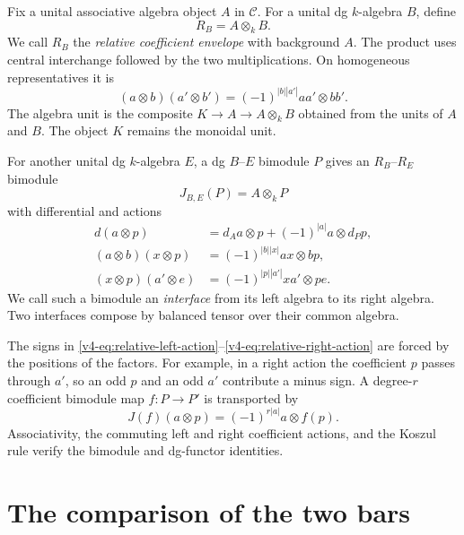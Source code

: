 Fix a unital associative algebra object \(A\) in \(\mathcal C\).
For a unital dg \(k\)-algebra \(B\), define
\begin{equation}\label{v4-eq:relative-algebra}
 R_B=A\otimes_kB.
\end{equation}
We call \(R_B\) the \emph{relative coefficient envelope}
with background \(A\).
The product uses central interchange followed by the two
multiplications. On homogeneous representatives it is
\[
 (a\otimes b)(a'\otimes b')
   =(-1)^{|b||a'|}aa'\otimes bb'.
\]
The algebra unit is the composite
\(K\to A\to A\otimes_kB\) obtained from the units of \(A\) and
\(B\). The object \(K\) remains the monoidal unit.

For another unital dg \(k\)-algebra \(E\),
a dg \(B\)--\(E\) bimodule \(P\) gives an
\(R_B\)--\(R_E\) bimodule
\begin{equation}\label{v4-eq:relative-interface}
 J_{B,E}(P)=A\otimes_kP
\end{equation}
with differential and actions
\begin{align}
 d(a\otimes p)
   &=d_Aa\otimes p+(-1)^{|a|}a\otimes d_Pp,
       \label{v4-eq:relative-differential}\\
 (a\otimes b)(x\otimes p)
   &=(-1)^{|b||x|}ax\otimes bp,
       \label{v4-eq:relative-left-action}\\
 (x\otimes p)(a'\otimes e)
   &=(-1)^{|p||a'|}xa'\otimes pe.
       \label{v4-eq:relative-right-action}
\end{align}
We call such a bimodule an \emph{interface} from its left
algebra to its right algebra. Two interfaces compose by
balanced tensor over their common algebra.

The signs in
\eqref{v4-eq:relative-left-action}--\eqref{v4-eq:relative-right-action}
are forced by the positions of the factors. For example, in a
right action the coefficient \(p\) passes through \(a'\), so an
odd \(p\) and an odd \(a'\) contribute a minus sign. A degree-\(r\)
coefficient bimodule map \(f:P\to P'\) is transported by
\begin{equation}\label{v4-eq:relative-map}
 J(f)(a\otimes p)=(-1)^{r|a|}a\otimes f(p).
\end{equation}
Associativity, the commuting left and right coefficient
actions, and the Koszul rule verify the bimodule and dg-functor
identities.

\section{The comparison of the two bars}
\label{v4-sec:relative-composition}

